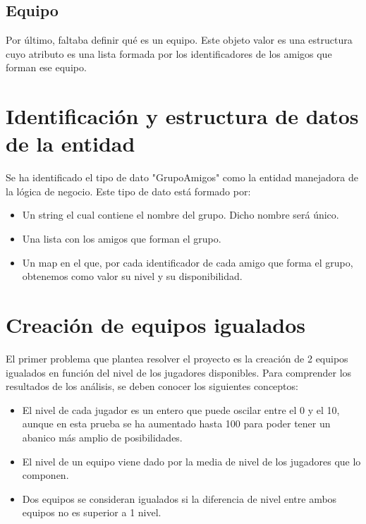 \subsection{Equipo}

Por último, faltaba definir qué es un equipo. Este objeto valor es una estructura cuyo atributo es una lista formada por los identificadores de los amigos que forman ese equipo.

\section{Identificación y estructura de datos de la entidad}
Se ha identificado el tipo de dato "GrupoAmigos" como la entidad manejadora de la lógica de negocio.
Este tipo de dato está formado por:

\begin{itemize}
    \item Un string el cual contiene el nombre del grupo. Dicho nombre será único.
    \item Una lista con los amigos que forman el grupo.
    \item Un map en el que, por cada identificador de cada amigo que forma el grupo, obtenemos como valor su nivel y su disponibilidad.
\end{itemize}


\section{Creación de equipos igualados}

El primer problema que plantea resolver el proyecto es la creación de 2 equipos igualados en función del nivel de los jugadores disponibles.
Para comprender los resultados de los análisis, se deben conocer los siguientes conceptos:

\begin{itemize}
    \item El nivel de cada jugador es un entero que puede oscilar entre el 0 y el 10, aunque en esta prueba se ha aumentado hasta 100 para poder tener un abanico más amplio de posibilidades.
    \item El nivel de un equipo viene dado por la media de nivel de los jugadores que lo componen.
    \item Dos equipos se consideran igualados si la diferencia de nivel entre ambos equipos no es superior a 1 nivel.
\end{itemize}

\newpage

